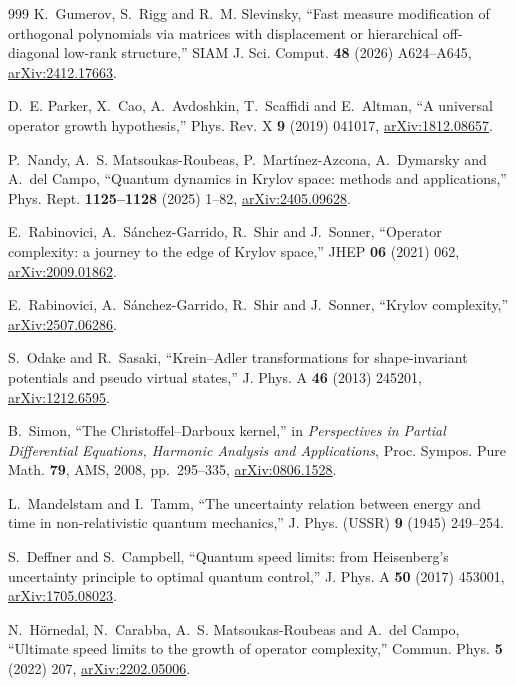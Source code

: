 \documentclass[a4paper,11pt]{article}
\theoremstyle{definition}
\theoremstyle{remark}
\begin{document}
\begin{thebibliography}{999}
K.~Gumerov, S.~Rigg and R.~M. Slevinsky,
``Fast measure modification of orthogonal polynomials via matrices with displacement or hierarchical off-diagonal low-rank structure,''
SIAM J. Sci. Comput. \textbf{48} (2026) A624--A645, 
\href{https://arxiv.org/abs/2412.17663}{arXiv:2412.17663}.

D.~E. Parker, X.~Cao, A.~Avdoshkin, T.~Scaffidi and E.~Altman,
``A universal operator growth hypothesis,''
Phys. Rev. X \textbf{9} (2019) 041017, \href{https://arxiv.org/abs/1812.08657}{arXiv:1812.08657}.

P.~Nandy, A.~S. Matsoukas-Roubeas, P.~Mart\'inez-Azcona, A.~Dymarsky and A.~del Campo, ``Quantum dynamics in Krylov space: methods and applications,'' Phys. Rept. \textbf{1125--1128} (2025) 1--82, \href{https://arxiv.org/abs/2405.09628}{arXiv:2405.09628}.

E.~Rabinovici, A.~S\'anchez-Garrido, R.~Shir and J.~Sonner,
``Operator complexity: a journey to the edge of Krylov space,''
JHEP \textbf{06} (2021) 062,
\href{https://arxiv.org/abs/2009.01862}{arXiv:2009.01862}.

E.~Rabinovici, A.~S\'anchez-Garrido, R.~Shir and J.~Sonner, ``Krylov complexity,'' \href{https://arxiv.org/abs/2507.06286}{arXiv:2507.06286}.

S.~Odake and R.~Sasaki,
``Krein--Adler transformations for shape-invariant potentials and pseudo virtual states,''
J. Phys. A \textbf{46} (2013) 245201,
\href{https://arxiv.org/abs/1212.6595}{arXiv:1212.6595}.

B.~Simon, ``The Christoffel--Darboux kernel,'' in \emph{Perspectives in Partial Differential Equations, Harmonic Analysis and Applications}, Proc. Sympos. Pure Math. \textbf{79}, AMS, 2008, pp.~295--335, \href{https://arxiv.org/abs/0806.1528}{arXiv:0806.1528}.

L.~Mandelstam and I.~Tamm, ``The uncertainty relation between energy and time in non-relativistic quantum mechanics,'' J. Phys. (USSR) \textbf{9} (1945) 249--254.

S.~Deffner and S.~Campbell, ``Quantum speed limits: from Heisenberg's uncertainty principle to optimal quantum control,'' J. Phys. A \textbf{50} (2017) 453001, \href{https://arxiv.org/abs/1705.08023}{arXiv:1705.08023}.

N.~H\"ornedal, N.~Carabba, A.~S. Matsoukas-Roubeas and A.~del Campo, ``Ultimate speed limits to the growth of operator complexity,'' Commun. Phys. \textbf{5} (2022) 207, \href{https://arxiv.org/abs/2202.05006}{arXiv:2202.05006}.


\end{thebibliography}
\end{document}
